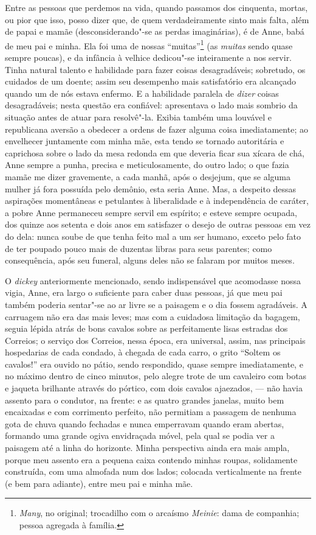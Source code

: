 Entre as pessoas que perdemos na vida, quando passamos dos
cinquenta, mortas, ou pior que isso, posso dizer que, de quem
verdadeiramente sinto mais falta, além de papai e mamãe 
(desconsiderando"-se as perdas imaginárias), é de Anne, babá de meu pai e
minha. Ela foi uma de nossas ``muitas''\footnote{\textit{Many}, no
  original; trocadilho com o arcaísmo \textit{Meinie}: dama de companhia;
  pessoa agregada à família.} (as \textit{muitas} sendo quase
sempre poucas), e da infância à velhice dedicou"-se inteiramente a nos
servir. Tinha natural talento e habilidade para fazer coisas
desagradáveis; sobretudo, os cuidados de um doente; assim seu desempenho
mais satisfatório era alcançado quando um de nós estava enfermo. E a
habilidade paralela de \textit{dizer} coisas desagradáveis; nesta questão
era confiável: apresentava o lado mais sombrio da situação antes de
atuar para resolvê"-la. Exibia também uma louvável e republicana aversão
a obedecer a ordens de fazer alguma coisa imediatamente; ao envelhecer
juntamente com minha mãe, esta tendo se tornado autoritária e caprichosa
sobre o lado da mesa redonda em que deveria ficar sua xícara de chá,
Anne sempre a punha, precisa e meticulosamente, do outro lado; o que
fazia mamãe me dizer gravemente, a cada manhã, após o desjejum, que se
alguma mulher já fora possuída pelo demônio, esta seria Anne. Mas, a
despeito dessas aspirações momentâneas e petulantes à liberalidade e à
independência de caráter, a pobre Anne permaneceu sempre servil em
espírito; e esteve sempre ocupada, dos quinze aos setenta e dois anos em
satisfazer o desejo de outras pessoas em vez do dela: nunca soube de que
tenha feito mal a um ser humano, exceto pelo fato de ter poupado pouco
mais de duzentas libras para seus parentes; como consequência, após seu
funeral, alguns deles não se falaram por muitos meses.

O \textit{dickey} anteriormente mencionado, sendo indispensável que
acomodasse nossa vigia, Anne, era largo o suficiente para caber duas
pessoas, já que meu pai também poderia sentar"-se ao ar livre se a
paisagem e o dia fossem agradáveis. A carruagem não era das mais leves;
mas com a cuidadosa limitação da bagagem, seguia lépida atrás de bons
cavalos sobre as perfeitamente lisas estradas dos Correios; o serviço
dos Correios, nessa época, era universal, assim, nas principais
hospedarias de cada condado, à chegada de cada carro, o grito ``Soltem
os cavalos!'' era ouvido no pátio, sendo respondido, quase sempre
imediatamente, e no máximo dentro de cinco minutos, pelo alegre trote de
um cavaleiro com botas e jaqueta brilhante através do pórtico, com dois
cavalos ajaezados, --- não havia assento para o condutor, na frente: e as
quatro grandes janelas, muito bem encaixadas e com corrimento perfeito,
não permitiam a passagem de nenhuma gota de chuva quando fechadas e
nunca emperravam quando eram abertas, formando uma grande ogiva
envidraçada móvel, pela qual se podia ver a paisagem até a linha do
horizonte. Minha perspectiva ainda era mais ampla, porque meu assento
era a pequena caixa contendo minhas roupas, solidamente construída, com
uma almofada num dos lados; colocada verticalmente na frente (e bem para
adiante), entre meu pai e minha mãe.

